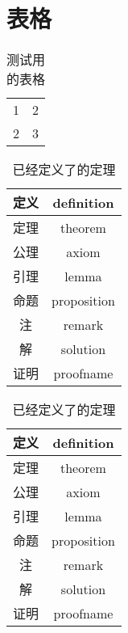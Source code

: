 \chapter{表格}


\begin{table}
	\centering
	\caption{测试用的表格}	
	\begin{tabular}{cc}
		  1    &      2  \\
		  2    &      3
	\end{tabular}
\end{table}

\begin{tcode}
\begin{table}
	\centering
	\caption{已经定义了的定理}
	\begin{tabular}{|c|c|}
		\hline               
		定义      &   definition  \\   \hline 
		定理      &   theorem    \\   \hline
		公理      &   axiom		\\   \hline
		引理		&	lemma		\\   \hline
		命题	   &	proposition \\  \hline
		注		  &	  remark		\\  \hline
		解		  &	  solution   \\ \hline
		证明		&	proofname  \\ \hline
		
	\end{tabular}
\end{table}
\end{tcode}


\begin{table}
	\centering
	\caption{已经定义了的定理}
	\begin{tabular}{|c|c|}
		\hline               
		定义      &   definition  \\   \hline 
		定理      &   theorem    \\   \hline
		公理      &   axiom		\\   \hline
		引理		&	lemma		\\   \hline
		命题	   &	proposition \\  \hline
		注		  &	  remark		\\  \hline
		解		  &	  solution   \\ \hline
		证明		&	proofname  \\ \hline
 		       
	\end{tabular}
\end{table}

